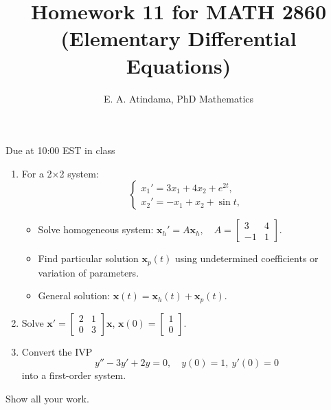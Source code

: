 \documentclass[a4paper,11pt,reqno]{amsart}
\title[MATH 2860 (Elementary Differential Equations)]{Homework 11 for MATH 2860 (Elementary Differential Equations)}
\author[Emmanuel Atindama]{E. A. Atindama, PhD Mathematics}
\numberwithin{equation}{section}
\begin{document}
\maketitle

Due at 10:00 EST in class

\begin{enumerate}[1.]
  \item For a 2×2 system:
    \[
    \begin{cases}
    x_1' = 3 x_1 + 4 x_2 + e^{2t},\\
    x_2' = -x_1 + x_2 + \sin t,
    \end{cases}
    \]
    \begin{itemize}
      \item[(a)] Solve homogeneous system:
      \(\mathbf{x}_h' = A \mathbf{x}_h, \quad A = \begin{bmatrix}3 & 4 \\ -1 & 1\end{bmatrix}\).
      \item[(b)] Find particular solution $\mathbf{x}_p(t)$ using undetermined coefficients or variation of parameters.
      \item[(c)] General solution: \(\mathbf{x}(t) = \mathbf{x}_h(t) + \mathbf{x}_p(t)\).
    \end{itemize}
  \vspace{1cm}

  \item Solve $\mathbf{x}' = \begin{bmatrix} 2 & 1 \\ 0 & 3 \end{bmatrix} \mathbf{x}$, $\mathbf{x}(0) = \begin{bmatrix} 1 \\ 0 \end{bmatrix}$.
  \vspace{1cm}

  \item Convert the IVP
        \[
        y'' - 3y' + 2y = 0, \quad y(0)=1, \ y'(0)=0
        \]
        into a first-order system.

\end{enumerate}
  \textcolor{red!20}{Show all your work.}
\end{document}
